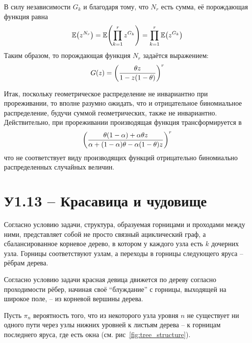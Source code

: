 \documentclass[a4paper]{article}
\let\originalleft\left
\let\originalright\right
\renewcommand{\left}{\mathopen{}\mathclose\bgroup\originalleft}
\renewcommand{\right}{\aftergroup\egroup\originalright}
\newcommand{\brac}[1]{{\left ( #1 \right )}}
\newcommand{\Ex}[0]{{\mathbb{E}}}
\begin{document}
В силу независимости $G_k$ и благодаря тому, что $N_r$ есть сумма, её
порождающая функция равна
\[\Ex\brac{z^{N_r}}=\Ex\brac{\prod_{k=1}^r z^{G_k}}=\prod_{k=1}^r \Ex\brac{z^{G_k}}\]
Таким образом, то порождающая функция $N_r$ задаётся выражением:
\[G(z) = \brac{\frac{\theta z }{1 - z (1-\theta)}}^r\]

Итак, поскольку геометрическое распределение не инвариантно при прореживании,
то вполне разумно ожидать, что и отрицательное биномиальное распределение,
будучи суммой геометрических, также не инвариантно.
Действительно, при прореживании производящая функция трансформируется в 
\[\brac{\frac{\theta (1 - \alpha) + \alpha \theta z }{\alpha + (1-\alpha) \theta - \alpha (1-\theta) z}}^r\]
что не соответствует виду производящих функций отрицательно биномиально
распределенных случайных величин.



\section{У1.13 -- Красавица и чудовище} %
\label{sec:task_1_13}

Согласно условию задачи, структура, образуемая горницами и проходами между
ними, представляет собой не просто связный ациклический граф, а
сбалансированное корневое дерево, в котором у каждого узла есть $k$ дочерних
узла.
Горницы соответствуют узлам, а переходы в горницы следующего яруса -- рёбрам
дерева.

Согласно условию задачи красная девица движется по дереву согласно
проходимости рёбер, начиная своё ``блуждание'' с горницы, выходящей на широкое
поле, -- из корневой вершины дерева.

Пусть $\pi_n$ вероятность того, что из некоторого узла уровня $n$ не
существует ни одного пути через узлы нижних уровней к листьям дерева -- к
горницам последнего яруса, где есть окна (см. рис~\ref{fig:tree_structure}).
\end{document}
